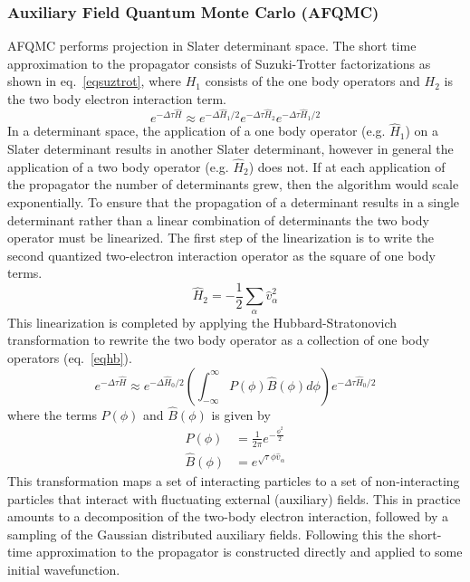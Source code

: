 \subsubsection{Auxiliary Field Quantum Monte Carlo (AFQMC)}
AFQMC performs projection in Slater determinant space.
The short time approximation to the propagator consists of Suzuki-Trotter factorizations as shown in eq.~\ref{eqsuztrot}, where $H_1$ consists of the one body operators and $H_2$ is the two body electron interaction term.
\begin{equation}
e^{-\Delta\tau\hat{H}} \approx e^{-\Delta\hat{H}_1/2} e^{-\Delta\tau\hat{H}_2} e^{-\Delta\tau\hat{H}_1/2}
\label{eqsuztrot}
\end{equation}
In a determinant space, the application of a one body operator (e.g. $\hat{H}_1$) on a Slater determinant results in another Slater determinant, however in general the application of a two body operator (e.g. $\hat{H}_2$) does not.
If at each application of the propagator the number of determinants grew, then the algorithm would scale exponentially. 
To ensure that the propagation of a determinant results in a single determinant rather than a linear combination of determinants the two body operator must be linearized.
The first step of the linearization is to write the second quantized two-electron interaction operator as the square of one body terms.
\begin{equation}
    \hat{H}_2 = -\frac{1}{2} \sum_{\alpha} \hat{v}^2_{\alpha}
    \label{eqdecomp}
\end{equation}
This linearization is completed by applying the Hubbard-Stratonovich transformation to rewrite the two body operator as a collection of one body operators (eq.~\ref{eqhb}).\cite{HStrans}
\begin{equation}
e^{-\Delta\tau\hat{H}} \approx e^{-\Delta\hat{H}_0/2} \left( \int_{-\infty}^{\infty} P(\phi) \hat{B}(\phi) d\phi \right) e^{-\Delta\tau\hat{H}_0/2}
\label{eqhb}
\end{equation}
where the terms $P(\phi)$ and  $\hat{B}(\phi)$ is given by
\begin{align}
    P(\phi) &= \frac{1}{2\pi} e^{-\frac{\phi^2}{2}} \\
    \hat{B}(\phi) &= e^{\sqrt{\tau} \phi \hat{v}_{\alpha}}
    \label{eqhb2}
\end{align}
This transformation maps a set of interacting particles to a set of non-interacting particles that interact with fluctuating external (auxiliary) fields.
This in practice amounts to a decomposition of the two-body electron interaction, followed by a sampling of the Gaussian distributed auxiliary fields.
Following this the short-time approximation to the propagator is constructed directly and applied to some initial wavefunction.

